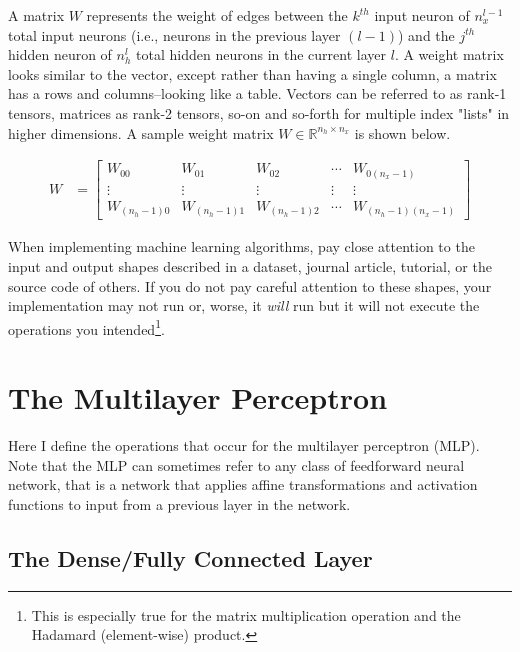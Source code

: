 \documentclass{article}
\begin{document}
A matrix $W$ represents the weight of edges between the $k^{th}$
input neuron of $n_x^{l-1}$ total input neurons (i.e., neurons in the previous layer $(l-1)$)
and the $j^{th}$ hidden neuron of $n_h^{l}$ total hidden neurons in the current layer $l$.
A weight matrix looks similar to the vector, except rather than having a single
column, a matrix has a rows and columns--looking like a table. Vectors can
be referred to as rank-1 tensors, matrices as rank-2 tensors, so-on and so-forth
for multiple index "lists" in higher dimensions. A sample weight matrix
$W \in \mathbb{R}^{n_h \times n_x}$ is shown below.

\begin{align}
	W & = \begin{bmatrix}
		W_{00}         & W_{01}         & W_{02}         & \cdots & W_{0(n_{x}-1)}         \\
		\vdots         & \vdots         & \vdots         & \vdots & \vdots                 \\
		W_{(n_{h}-1)0} & W_{(n_{h}-1)1} & W_{(n_{h}-1)2} & \cdots & W_{(n_{h}-1)(n_{x}-1)}
	\end{bmatrix}
\end{align}

When implementing machine learning algorithms, pay close attention to the
input and output shapes described in a dataset, journal article, tutorial, or
the source code of others. If you do not pay careful attention to these shapes,
your implementation may not run or, worse, it \textit{will} run but it will not execute
the operations you intended\footnote{This is especially true for the
	matrix multiplication operation and the Hadamard (element-wise) product.}.

\section{The Multilayer Perceptron}

Here I define the operations that occur for the multilayer perceptron (MLP).
Note that the MLP can sometimes refer to any class of feedforward
neural network, that is a network that applies affine transformations and
activation functions to input from a previous layer in the network.

\subsection{The Dense/Fully Connected Layer}
\end{document}
